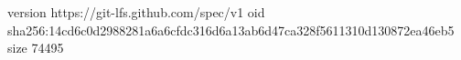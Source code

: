 version https://git-lfs.github.com/spec/v1
oid sha256:14cd6c0d2988281a6a6cfdc316d6a13ab6d47ca328f5611310d130872ea46eb5
size 74495

